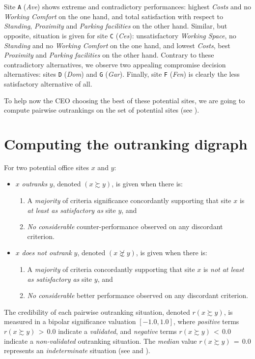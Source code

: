 Site \texttt{A} (\emph{Ave}) shows extreme and contradictory performances: highest \emph{Costs} and no \emph{Working Comfort} on the one hand, and total satisfaction with respect to \emph{Standing}, \emph{Proximity} and \emph{Parking facilities} on the other hand. Similar, but opposite, situation is given for site \texttt{C} (\emph{Ces}): unsatisfactory \emph{Working Space}, no \emph{Standing} and no \emph{Working Comfort} on the one hand, and lowest \emph{Costs}, best \emph{Proximity} and \emph{Parking facilities} on the other hand. Contrary to these contradictory alternatives, we observe two appealing compromise decision alternatives: sites \texttt{D} (\emph{Dom}) and \texttt{G} (\emph{Gar}). Finally, site \texttt{F} (\emph{Fen}) is clearly the less satisfactory alternative of all.

To help now the CEO choosing the best of these potential sites, we are going to compute pairwise outrankings on the set of potential sites (see \citet{BIS-2013}).

\section{Computing the outranking digraph}
\label{sec:4.2}

\begin{definition}
For two potential office sites $x$ and $y$:
\begin{itemize}[leftmargin=1cm]
\item $x$ \emph{outranks} $y$, denoted $(x \succsim y)$, is given when there is:
   \begin{enumerate}
     \item A \emph{majority} of criteria significance concordantly supporting that site $x$ is \emph{at least as satisfactory as} site $y$, and
     \item \emph{No considerable} counter-performance observed on any discordant criterion.      
    \end{enumerate}
\item $x$ \emph{does not outrank} $y$, denoted $(x \not\succsim y)$, is given when there is:
   \begin{enumerate}
    \item A \emph{majority} of criteria concordantly supporting that site $x$ is \emph{not at least as satisfactory as} site $y$, and
    \item \emph{No considerable} better performance observed on any discordant criterion.
    \end{enumerate}
\end{itemize}
\end{definition}
The credibility of each pairwise outranking situation, denoted $r(x \succsim y)$, is measured in a bipolar significance valuation $[-1.0, 1.0]$, where \emph{positive} terms $r(x \succsim y)\, >\, 0.0$ indicate a \emph{validated}, and \emph{negative} terms $r(x \succsim y)\, <\, 0.0$ indicate a \emph{non-validated} outranking situation. The \emph{median} value $r(x \succsim y)\, = \,0.0$ represents an \emph{indeterminate} situation (see \citet{BIS-2004a} and \citet{BIS-2013}).   

